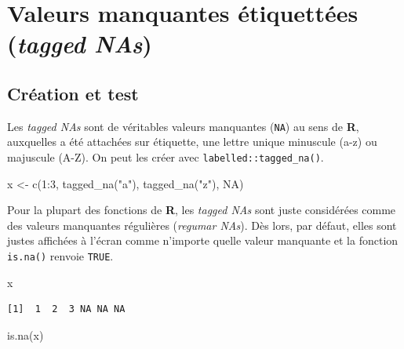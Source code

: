 \documentclass[
  letterpaper,
  DIV=11,
  numbers=noendperiod,
  oneside]{scrreprt}
\newenvironment{Shaded}{\begin{snugshade}}{\end{snugshade}}
\newcommand{\ConstantTok}[1]{\textcolor[rgb]{0.56,0.35,0.01}{#1}}
\newcommand{\DecValTok}[1]{\textcolor[rgb]{0.68,0.00,0.00}{#1}}
\newcommand{\FunctionTok}[1]{\textcolor[rgb]{0.28,0.35,0.67}{#1}}
\newcommand{\NormalTok}[1]{\textcolor[rgb]{0.00,0.23,0.31}{#1}}
\newcommand{\OtherTok}[1]{\textcolor[rgb]{0.00,0.23,0.31}{#1}}
\newcommand{\SpecialCharTok}[1]{\textcolor[rgb]{0.37,0.37,0.37}{#1}}
\newcommand{\StringTok}[1]{\textcolor[rgb]{0.13,0.47,0.30}{#1}}
\begin{document}
\hypertarget{sec-tagged-na}{%
\section{\texorpdfstring{Valeurs manquantes étiquettées (\emph{tagged
NAs})}{Valeurs manquantes étiquettées (tagged NAs)}}\label{sec-tagged-na}}

\hypertarget{cruxe9ation-et-test}{%
\subsection{Création et test}\label{cruxe9ation-et-test}}

Les \emph{tagged NAs} sont de véritables valeurs manquantes
(\texttt{NA}) au sens de \textbf{R}, auxquelles a été attachées sur
étiquette, une lettre unique minuscule (a-z) ou majuscule (A-Z). On peut
les créer avec \texttt{labelled::tagged\_na()}.

\begin{Shaded}
\begin{Highlighting}[]
\NormalTok{x }\OtherTok{\textless{}{-}} \FunctionTok{c}\NormalTok{(}\DecValTok{1}\SpecialCharTok{:}\DecValTok{3}\NormalTok{, }\FunctionTok{tagged\_na}\NormalTok{(}\StringTok{"a"}\NormalTok{), }\FunctionTok{tagged\_na}\NormalTok{(}\StringTok{"z"}\NormalTok{), }\ConstantTok{NA}\NormalTok{)}
\end{Highlighting}
\end{Shaded}

Pour la plupart des fonctions de \textbf{R}, les \emph{tagged NAs} sont
juste considérées comme des valeurs manquantes régulières (\emph{regumar
NAs}). Dès lors, par défaut, elles sont justes affichées à l'écran comme
n'importe quelle valeur manquante et la fonction \texttt{is.na()}
renvoie \texttt{TRUE}.

\begin{Shaded}
\begin{Highlighting}[]
\NormalTok{x}
\end{Highlighting}
\end{Shaded}

\begin{verbatim}
[1]  1  2  3 NA NA NA
\end{verbatim}

\begin{Shaded}
\begin{Highlighting}[]
\FunctionTok{is.na}\NormalTok{(x)}
\end{Highlighting}
\end{Shaded}
\end{document}
